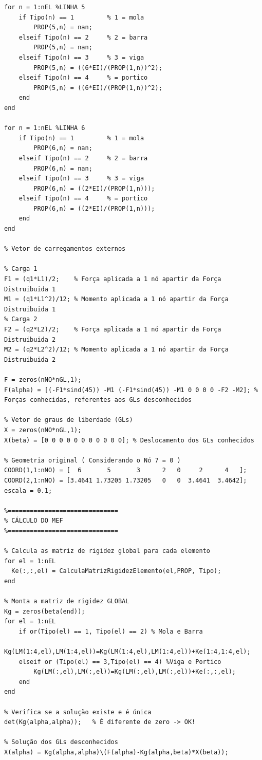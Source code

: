 \documentclass[deposito, acronym, symbols]{fei}
\begin{document}
\begin{lstlisting}
for n = 1:nEL %LINHA 5
    if Tipo(n) == 1         % 1 = mola
        PROP(5,n) = nan;
    elseif Tipo(n) == 2     % 2 = barra
        PROP(5,n) = nan;
    elseif Tipo(n) == 3     % 3 = viga
        PROP(5,n) = ((6*EI)/(PROP(1,n))^2);
    elseif Tipo(n) == 4     % = portico 
        PROP(5,n) = ((6*EI)/(PROP(1,n))^2);
    end
end

for n = 1:nEL %LINHA 6
    if Tipo(n) == 1         % 1 = mola
        PROP(6,n) = nan;
    elseif Tipo(n) == 2     % 2 = barra
        PROP(6,n) = nan;
    elseif Tipo(n) == 3     % 3 = viga
        PROP(6,n) = ((2*EI)/(PROP(1,n)));
    elseif Tipo(n) == 4     % = portico 
        PROP(6,n) = ((2*EI)/(PROP(1,n)));
    end
end

% Vetor de carregamentos externos

% Carga 1
F1 = (q1*L1)/2;    % Força aplicada a 1 nó apartir da Força Distruibuida 1 
M1 = (q1*L1^2)/12; % Momento aplicada a 1 nó apartir da Força Distruibuida 1
% Carga 2
F2 = (q2*L2)/2;    % Força aplicada a 1 nó apartir da Força Distruibuida 2 
M2 = (q2*L2^2)/12; % Momento aplicada a 1 nó apartir da Força Distruibuida 2

F = zeros(nNO*nGL,1);
F(alpha) = [(-F1*sind(45)) -M1 (-F1*sind(45)) -M1 0 0 0 0 -F2 -M2]; % Forças conhecidas, referentes aos GLs desconhecidos

% Vetor de graus de liberdade (GLs)
X = zeros(nNO*nGL,1);
X(beta) = [0 0 0 0 0 0 0 0 0 0 0]; % Deslocamento dos GLs conhecidos

% Geometria original ( Considerando o Nó 7 = 0 )
COORD(1,1:nNO) = [  6       5       3      2   0     2      4   ];
COORD(2,1:nNO) = [3.4641 1.73205 1.73205   0   0  3.4641  3.4642];
escala = 0.1;

%==============================
% CÁLCULO DO MEF
%==============================

% Calcula as matriz de rigidez global para cada elemento
for el = 1:nEL
  Ke(:,:,el) = CalculaMatrizRigidezElemento(el,PROP, Tipo);
end

% Monta a matriz de rigidez GLOBAL
Kg = zeros(beta(end));
for el = 1:nEL
    if or(Tipo(el) == 1, Tipo(el) == 2) % Mola e Barra
        Kg(LM(1:4,el),LM(1:4,el))=Kg(LM(1:4,el),LM(1:4,el))+Ke(1:4,1:4,el);
    elseif or (Tipo(el) == 3,Tipo(el) == 4) %Viga e Portico
        Kg(LM(:,el),LM(:,el))=Kg(LM(:,el),LM(:,el))+Ke(:,:,el);
    end       
end

% Verifica se a solução existe e é única
det(Kg(alpha,alpha));   % É diferente de zero -> OK! 

% Solução dos GLs desconhecidos
X(alpha) = Kg(alpha,alpha)\(F(alpha)-Kg(alpha,beta)*X(beta));


\end{lstlisting}
\end{document}
